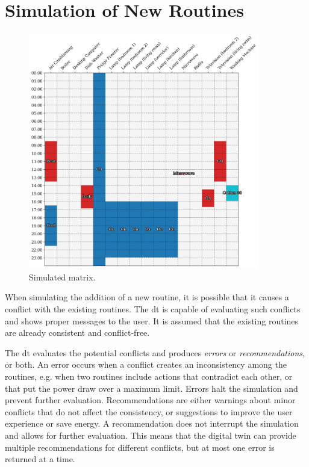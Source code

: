 \section{Simulation of New Routines}

\begin{figure}
    \centering
    \includegraphics[width=0.9\textwidth]{images/simulated_matrix.png}
    \caption{Simulated matrix.}
    \label{fig:simulated_consumption_matrix}
\end{figure}

When simulating the addition of a new routine, it is possible that it causes a conflict with the existing routines. The \acrshort{dt} is capable of evaluating such conflicts and shows proper messages to the user. It is assumed that the existing routines are already consistent and conflict-free.

The \acrshort{dt} evaluates the potential conflicts and produces \textit{errors} or \textit{recommendations}, or both. An error occurs when a conflict creates an inconsistency among the routines, e.g. when two routines include actions that contradict each other, or that put the power draw over a maximum limit. Errors halt the simulation and prevent further evaluation. Recommendations are either warnings about minor conflicts that do not affect the consistency, or suggestions to improve the user experience or save energy. A recommendation does not interrupt the simulation and allows for further evaluation. This means that the digital twin can provide multiple recommendations for different conflicts, but at most one error is returned at a time.

